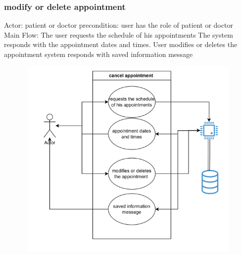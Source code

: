 \documentclass{scrreprt}
\begin{document}
	\subsubsection{ modify or delete appointment}
	Actor: patient or doctor
	precondition: user has the role of patient or doctor\\
	Main Flow:
	The user requests the schedule of his appointments 
	The system responds with the appointment dates and times.
	User modifies or deletes the appointment 
	system responds with saved information message
	\begin{figure}[h]
		\begin{center}
			\includegraphics[width=350pt,height=280pt]{usuario5.png}
		\end{center}
		\label{fig:Use case 5}
	\end{figure}
	\pagebreak
\end{document}

